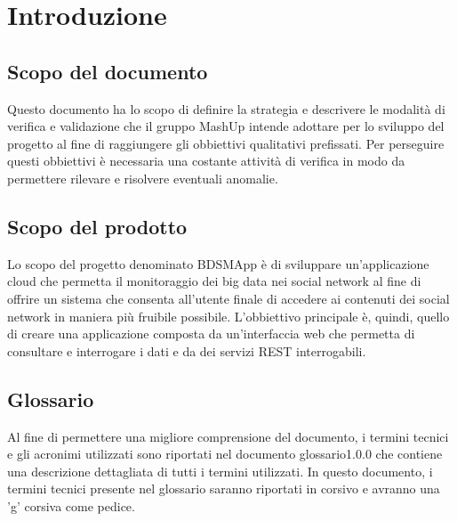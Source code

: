 %


\section{Introduzione}
	\subsection{Scopo del documento}
	Questo documento ha lo scopo di definire la strategia e descrivere le modalità di verifica e validazione che il gruppo MashUp intende adottare per lo sviluppo del progetto al fine di raggiungere gli obbiettivi qualitativi prefissati. Per perseguire questi obbiettivi è necessaria una costante attività di verifica in modo da permettere rilevare e risolvere eventuali anomalie.

	\subsection{Scopo del prodotto}
	Lo scopo del progetto denominato BDSMApp è di sviluppare un'applicazione cloud che permetta il monitoraggio dei big data nei social network al fine di offrire un sistema che consenta all'utente finale di accedere ai contenuti dei social network in maniera più fruibile possibile. L'obbiettivo principale è, quindi, quello di creare una applicazione composta da un'interfaccia web che permetta di consultare e interrogare i dati e da dei servizi REST interrogabili.

	\subsection{Glossario}
	Al fine di permettere una migliore comprensione del documento, i termini tecnici e gli acronimi utilizzati sono riportati nel documento glossario1.0.0 che contiene una descrizione dettagliata di tutti i termini utilizzati. In questo documento, i termini tecnici presente nel glossario saranno riportati in corsivo e avranno una 'g' corsiva come pedice.

